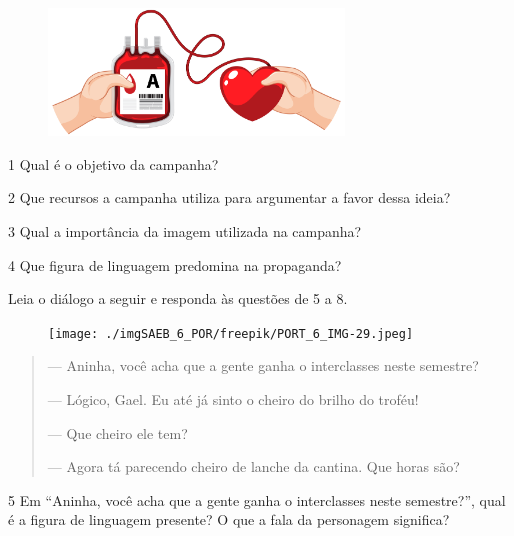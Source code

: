 \begin{figure}[H]
\centering\includegraphics[width=0.7\textwidth]{./imgSAEB_6_POR/freepik/PORT_6_IMG-28.jpeg}
\end{figure}

\num{1} Qual é o objetivo da campanha?


\num{2} Que recursos a campanha utiliza para argumentar a favor dessa
ideia?


\num{3} Qual a importância da imagem utilizada na campanha?


\num{4} Que figura de linguagem predomina na propaganda?


\pagebreak

\noindent Leia o diálogo a seguir e responda às questões de 5 a 8.


\begin{figure}[H]
\centering\texttt{[image: ./imgSAEB\_6\_POR/freepik/PORT\_6\_IMG-29.jpeg]}
\end{figure}

\begin{quote}
--- Aninha, você acha que a gente ganha o interclasses neste semestre?

--- Lógico, Gael. Eu até já sinto o cheiro do brilho do troféu!

--- Que cheiro ele tem?

--- Agora tá parecendo cheiro de lanche da cantina. Que horas são?
\end{quote}

\num{5} Em ``Aninha, você acha que a gente ganha o interclasses neste
semestre?'', qual é a figura de linguagem presente? O que a fala da
personagem significa?

